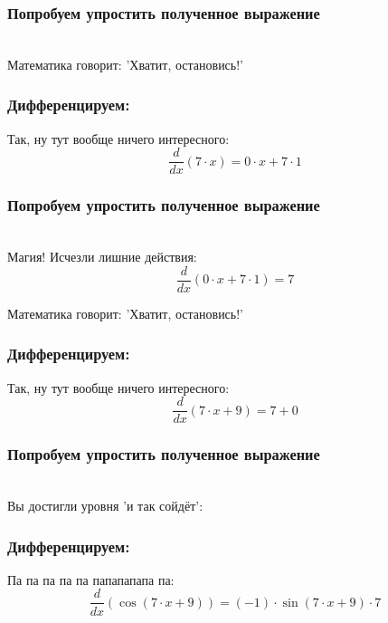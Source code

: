 \documentclass[a4paper,12pt]{article}
\begin{document}
\subsubsection*{Попробуем упростить полученное выражение}
\\Математика говорит: 'Хватит, остановись!'

\subsubsection*{Дифференцируем:}

Так, ну тут вообще ничего интересного:
\begin{dmath}\frac{d}{dx}\left(7\cdot x\right)=0\cdot x+ 7\cdot 1\end{dmath}
\subsubsection*{Попробуем упростить полученное выражение}
\\Магия! Исчезли лишние действия:\\
\begin{dmath}
	\frac{d}{dx}\left(0\cdot x+ 7\cdot 1\right) = 7\end{dmath}

Математика говорит: 'Хватит, остановись!'

\subsubsection*{Дифференцируем:}

Так, ну тут вообще ничего интересного:
\begin{dmath}\frac{d}{dx}\left(7\cdot x+ 9\right)=7+ 0\end{dmath}
\subsubsection*{Попробуем упростить полученное выражение}
\\Вы достигли уровня 'и так сойдёт':

\subsubsection*{Дифференцируем:}

Па па па па па папапапапа па:
\begin{dmath}\frac{d}{dx}\left(\operatorname{cos}\left(7\cdot x+ 9\right) \right)=(-1)\cdot \operatorname{sin}\left(7\cdot x+ 9\right) \cdot 7\end{dmath}
\end{document}

